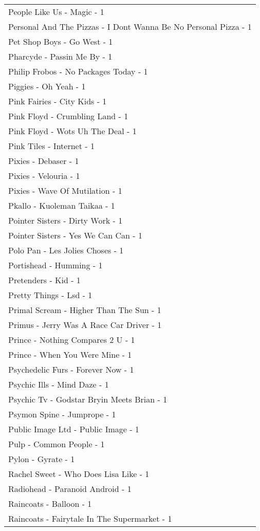 \documentclass[
]{article}
\begin{document}
\begin{longtable}{l}
People Like Us - Magic - 1 \\ 
Personal And The Pizzas - I Dont Wanna Be No Personal Pizza - 1 \\ 
Pet Shop Boys - Go West - 1 \\ 
Pharcyde - Passin Me By - 1 \\ 
Philip Frobos - No Packages Today - 1 \\ 
Piggies - Oh Yeah - 1 \\ 
Pink Fairies - City Kids - 1 \\ 
Pink Floyd - Crumbling Land - 1 \\ 
Pink Floyd - Wots Uh The Deal - 1 \\ 
Pink Tiles - Internet - 1 \\ 
Pixies - Debaser - 1 \\ 
Pixies - Velouria - 1 \\ 
Pixies - Wave Of Mutilation - 1 \\ 
Pkallo - Kuoleman Taikaa - 1 \\ 
Pointer Sisters - Dirty Work - 1 \\ 
Pointer Sisters - Yes We Can Can - 1 \\ 
Polo Pan - Les Jolies Choses - 1 \\ 
Portishead - Humming - 1 \\ 
Pretenders - Kid - 1 \\ 
Pretty Things - Lsd - 1 \\ 
Primal Scream - Higher Than The Sun - 1 \\ 
Primus - Jerry Was A Race Car Driver - 1 \\ 
Prince - Nothing Compares 2 U - 1 \\ 
Prince - When You Were Mine - 1 \\ 
Psychedelic Furs - Forever Now - 1 \\ 
Psychic Ills - Mind Daze - 1 \\ 
Psychic Tv - Godstar Bryin Meets Brian - 1 \\ 
Psymon Spine - Jumprope - 1 \\ 
Public Image Ltd - Public Image - 1 \\ 
Pulp - Common People - 1 \\ 
Pylon - Gyrate - 1 \\ 
Rachel Sweet - Who Does Lisa Like - 1 \\ 
Radiohead - Paranoid Android - 1 \\ 
Raincoats - Balloon - 1 \\ 
Raincoats - Fairytale In The Supermarket - 1 \\ 

\end{longtable}
\end{document}
